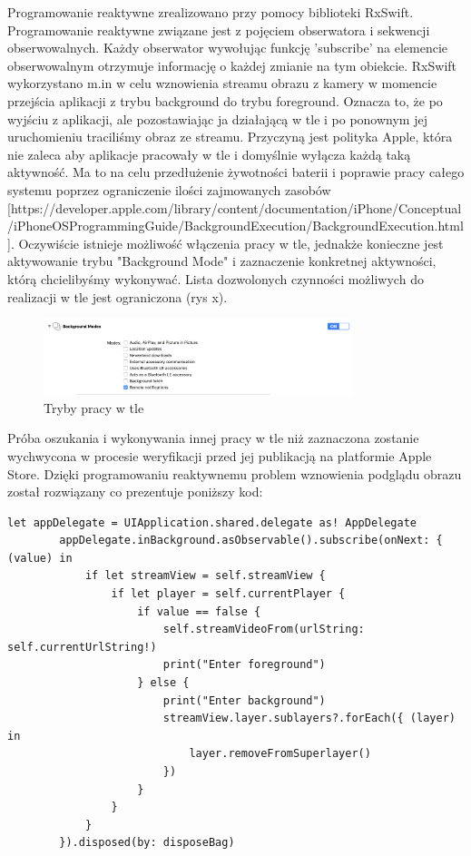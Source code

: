 Programowanie reaktywne zrealizowano przy pomocy biblioteki RxSwift. Programowanie reaktywne związane jest z pojęciem obserwatora i sekwencji obserwowalnych. Każdy obserwator wywołując funkcję 'subscribe' na elemencie obserwowalnym otrzymuje informację o każdej zmianie na tym obiekcie. RxSwift wykorzystano m.in w celu wznowienia streamu obrazu z kamery w momencie przejścia aplikacji z trybu background do trybu foreground. Oznacza to, że po wyjściu z aplikacji, ale pozostawiając ja działającą w tle i po ponownym jej uruchomieniu traciliśmy obraz ze streamu. Przyczyną jest polityka Apple, która nie zaleca aby aplikacje pracowały w tle i domyślnie wyłącza każdą taką aktywność. Ma to na celu przedłużenie żywotności baterii i poprawie pracy całego systemu poprzez ograniczenie ilości zajmowanych zasobów [https://developer.apple.com/library/content/documentation/iPhone/Conceptual/iPhoneOSProgrammingGuide/BackgroundExecution/BackgroundExecution.html].  Oczywiście istnieje możliwość włączenia pracy w tle, jednakże konieczne jest aktywowanie trybu "Background Mode" i zaznaczenie konkretnej aktywności, którą chcielibyśmy wykonywać. Lista dozwolonych czynności możliwych do realizacji w tle jest ograniczona (rys x). 
\begin{figure}[h]
	\centering
	\includegraphics[width=9cm]{backgroundModes}
	\caption{Tryby pracy w tle}
\end{figure}
Próba oszukania i wykonywania innej pracy w tle niż zaznaczona zostanie wychwycona w procesie weryfikacji przed jej publikacją na platformie Apple Store. Dzięki programowaniu reaktywnemu problem wznowienia podglądu obrazu został rozwiązany co prezentuje poniższy kod:
\begin{verbatim}
let appDelegate = UIApplication.shared.delegate as! AppDelegate
        appDelegate.inBackground.asObservable().subscribe(onNext: { (value) in
            if let streamView = self.streamView {
                if let player = self.currentPlayer {
                    if value == false {
                        self.streamVideoFrom(urlString: self.currentUrlString!)
                        print("Enter foreground")
                    } else {
                        print("Enter background")
                        streamView.layer.sublayers?.forEach({ (layer) in
                            layer.removeFromSuperlayer()
                        })
                    }
                }
            }
        }).disposed(by: disposeBag)
\end{verbatim}
